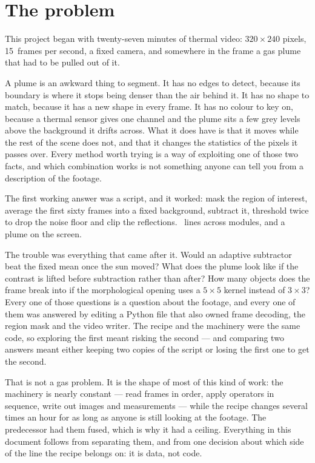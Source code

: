 \section{The problem}

This project began with twenty-seven minutes of thermal video: $320\times240$
pixels, 15~frames per second, a fixed camera, and somewhere in the frame a gas
plume that had to be pulled out of it.

A plume is an awkward thing to segment. It has no edges to detect, because its
boundary is where it stops being denser than the air behind it. It has no shape
to match, because it has a new shape in every frame. It has no colour to key on,
because a thermal sensor gives one channel and the plume sits a few grey levels
above the background it drifts across. What it does have is that it moves while
the rest of the scene does not, and that it changes the statistics of the pixels
it passes over. Every method worth trying is a way of exploiting one of those two
facts, and which combination works is not something anyone can tell you from a
description of the footage.

The first working answer was a script, and it worked: mask the region of interest,
average the first sixty frames into a fixed background, subtract it, threshold
twice to drop the noise floor and clip the reflections. \LegacyLOC{}~lines across
\LegacyModules{} modules, and a plume on the screen.

The trouble was everything that came after it. Would an adaptive subtractor beat
the fixed mean once the sun moved? What does the plume look like if the contrast
is lifted before subtraction rather than after? How many objects does the frame
break into if the morphological opening uses a $5\times5$ kernel instead of
$3\times3$? Every one of those questions is a question about the footage, and
every one of them was answered by editing a Python file that also owned frame
decoding, the region mask and the video writer. The recipe and the machinery were
the same code, so exploring the first meant risking the second --- and comparing
two answers meant either keeping two copies of the script or losing the first one
to get the second.

That is not a gas problem. It is the shape of most of this kind of work: the
machinery is nearly constant --- read frames in order, apply operators in
sequence, write out images and measurements --- while the recipe changes several
times an hour for as long as anyone is still looking at the footage. The
predecessor had them fused, which is why it had a ceiling. Everything in this
document follows from separating them, and from one decision about which side of
the line the recipe belongs on: it is data, not code.
